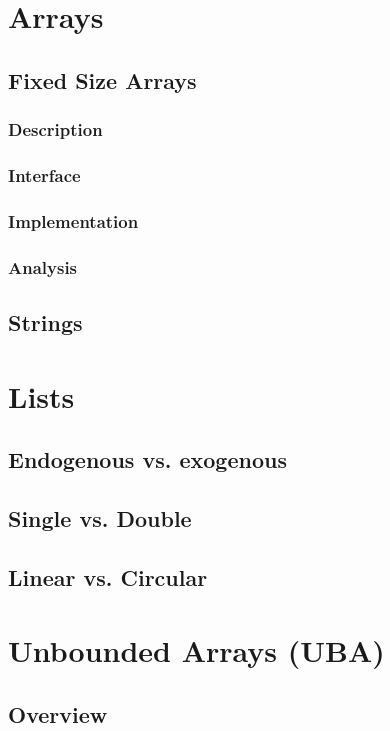 \documentclass[12pt, letterpaper]{book}
\begin{document}
\section{Arrays} \label{arrays}

\subsection{Fixed Size Arrays}
	\subsubsection{Description}
	\subsubsection{Interface}
	\subsubsection{Implementation}
	\subsubsection{Analysis}

	\subsection{Strings}

\section{Lists} \label{lists}

	\subsection{Endogenous vs. exogenous}
	\subsection{Single vs. Double}
	\subsection{Linear vs. Circular}

\section{Unbounded Arrays (UBA)}

	\subsection{Overview}
\end{document}
